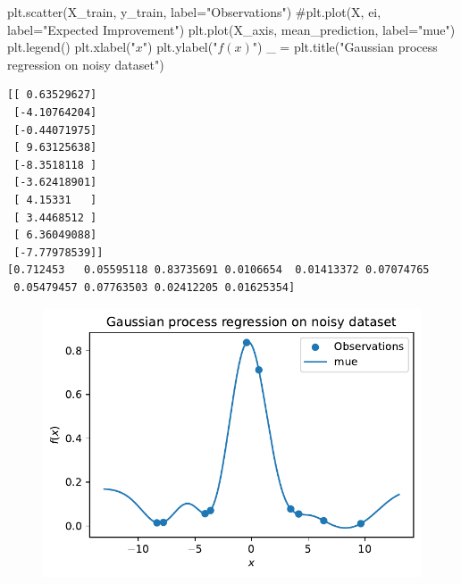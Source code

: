 \documentclass[
  letterpaper,
  DIV=11,
  numbers=noendperiod]{scrreprt}
\newenvironment{Shaded}{\begin{snugshade}}{\end{snugshade}}
\newcommand{\CommentTok}[1]{\textcolor[rgb]{0.37,0.37,0.37}{#1}}
\newcommand{\NormalTok}[1]{\textcolor[rgb]{0.00,0.23,0.31}{#1}}
\newcommand{\OperatorTok}[1]{\textcolor[rgb]{0.37,0.37,0.37}{#1}}
\newcommand{\StringTok}[1]{\textcolor[rgb]{0.13,0.47,0.30}{#1}}
\begin{document}
\begin{Shaded}
\begin{Highlighting}[]
\NormalTok{plt.scatter(X\_train, y\_train, label}\OperatorTok{=}\StringTok{"Observations"}\NormalTok{)}
\CommentTok{\#plt.plot(X, ei, label="Expected Improvement")}
\NormalTok{plt.plot(X\_axis, mean\_prediction, label}\OperatorTok{=}\StringTok{"mue"}\NormalTok{)}
\NormalTok{plt.legend()}
\NormalTok{plt.xlabel(}\StringTok{"$x$"}\NormalTok{)}
\NormalTok{plt.ylabel(}\StringTok{"$f(x)$"}\NormalTok{)}
\NormalTok{\_ }\OperatorTok{=}\NormalTok{ plt.title(}\StringTok{"Gaussian process regression on noisy dataset"}\NormalTok{)}
\end{Highlighting}
\end{Shaded}

\begin{verbatim}
[[ 0.63529627]
 [-4.10764204]
 [-0.44071975]
 [ 9.63125638]
 [-8.3518118 ]
 [-3.62418901]
 [ 4.15331   ]
 [ 3.4468512 ]
 [ 6.36049088]
 [-7.77978539]]
[0.712453   0.05595118 0.83735691 0.0106654  0.01413372 0.07074765
 0.05479457 0.07763503 0.02412205 0.01625354]
\end{verbatim}

\begin{figure}[H]

{\centering \includegraphics{07_spot_ei_files/figure-pdf/cell-56-output-2.pdf}

}

\end{figure}
\end{document}
